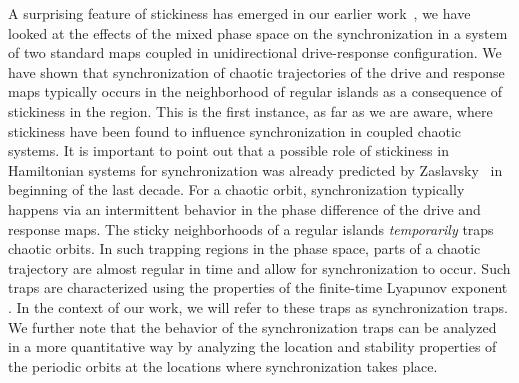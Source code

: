\documentclass[reprint,amsmath,amssymb,aps,pre]{revtex4-1}
\begin{document}
A surprising feature of stickiness has emerged in our earlier 
work~\cite{Mahata2016}, we have looked at the effects of the mixed phase space 
on the synchronization in a system of two standard maps coupled in 
unidirectional drive-response configuration. We have shown that 
synchronization of chaotic trajectories of the drive and response maps 
typically occurs in the neighborhood of regular islands as a consequence of 
stickiness in the region.  This is the first instance, as far as we are aware, 
where stickiness have been found to influence synchronization in coupled 
chaotic systems. It is important to point out that a possible role of stickiness in 
Hamiltonian systems for synchronization was already predicted by 
Zaslavsky~\cite{Zaslavsky2002b} in beginning of the last decade.  For a chaotic 
orbit, synchronization typically happens via an intermittent behavior in the 
phase difference of the drive and response maps.   The sticky neighborhoods of 
a regular islands {\it temporarily} traps chaotic orbits. In such trapping 
regions in the phase space, parts of a  chaotic trajectory are almost regular 
in time and allow for synchronization to occur. Such traps are characterized 
using the properties of the finite-time Lyapunov exponent \cite{Szezech2005}. 
In the context of our work, we will refer to these traps as synchronization 
traps. We further note that the behavior of the synchronization traps can be 
analyzed in a more quantitative way by analyzing the location and stability 
properties of the periodic orbits at the locations where 
synchronization takes place.
\end{document}
